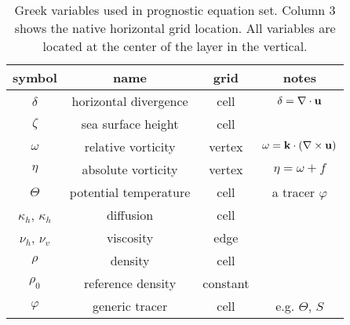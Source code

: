 \begin{table}[ht] 
\caption{Greek variables used in prognostic equation set.  Column 3 shows the native horizontal grid location.  All variables are located at the center of the layer in the vertical.} 
\vspace{0.5cm} \centering 
\begin{tabular}{c c c c} 
\hline\hline symbol &  name & grid & notes  \\
\hline 
$\delta$ & horizontal divergence & cell  & $\delta=\nabla\cdot{\bf u}$  \\
$\zeta$ & sea surface height & cell   \\
$\omega$ & relative vorticity & vertex & $\omega={\bf k} \cdot \left( \nabla \times {\bf u} \right)$\\
$\eta$ & absolute vorticity & vertex  & $\eta=\omega+f$ \\
$\Theta$ & potential temperature & cell  & a tracer $\varphi$ \\
$\kappa_h$, $\kappa_h$ & diffusion & cell \\ 
$\nu_h$, $\nu_v$ & viscosity & edge \\
$\rho$ & density & cell  \\
$\rho_0$ & reference density & constant & \\
$\varphi$ & generic tracer & cell & e.g. $\Theta$, $S$ \\
\hline 
\end{tabular} \label{oceanTable:variables_Greek} 
\end{table}
